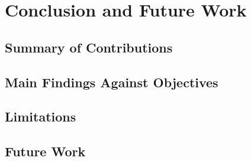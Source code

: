 \chapter{Conclusion and Future Work}
\label{cha:conclusion}

\section{Summary of Contributions}
\label{sec:summary-contributions}

\section{Main Findings Against Objectives}
\label{sec:main-findings}

\section{Limitations}
\label{sec:limitations}

\section{Future Work}
\label{sec:future-work}
